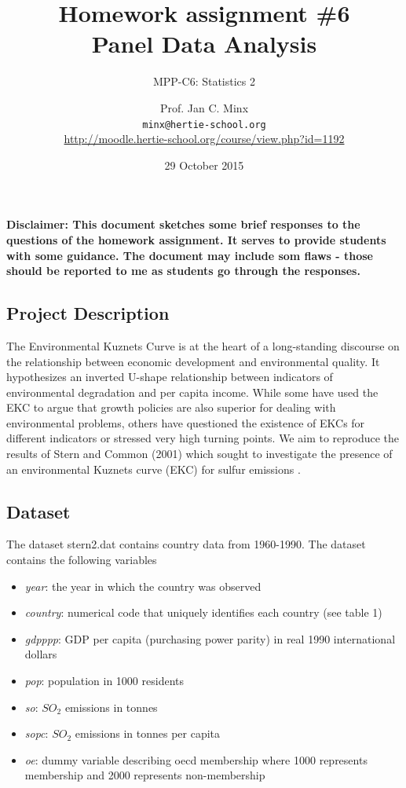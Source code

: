 \documentclass{scrartcl}
\begin{document}
	\title{Homework assignment \#6\\ Panel Data Analysis}
	\subtitle{MPP-C6: Statistics 2}
	\author{Prof. Jan C. Minx\\ \texttt{minx@hertie-school.org} \\
		\url{http://moodle.hertie-school.org/course/view.php?id=1192}}
	\date{29 October 2015}
	
	\maketitle
	
	\indent\textbf{Disclaimer: This document sketches some brief responses to the questions of the homework assignment. It serves to provide students with some guidance. The document may include som flaws - those should be reported to me as students go through the responses.}

	\subsection*{Project Description}
	The Environmental Kuznets Curve is at the heart of a long-standing discourse on the relationship between economic development and environmental quality. It hypothesizes an inverted U-shape relationship between indicators of environmental degradation and per capita income. While some have used the EKC to argue that growth policies are also superior for dealing with environmental problems, others have questioned the existence of EKCs for different indicators or stressed very high turning points. We aim to reproduce the results of Stern and Common (2001) which sought to investigate the presence of an environmental Kuznets curve (EKC) for sulfur emissions \cite{stern2001there}.
	
	\subsection*{Dataset}
	The dataset stern2.dat contains country data from 1960-1990. The dataset contains the following variables
	\begin{itemize}
	\item \textit{year}: the year in which the country was observed 
	\item \textit{country}: numerical code that uniquely identifies each country (see table 1)
	\item \textit{gdpppp}: GDP per capita (purchasing power parity) in real 1990 international dollars
	\item \textit{pop}: population in 1000 residents
	\item \textit{so}: \(SO_2\) emissions in tonnes
	\item \textit{sopc}: \(SO_2\) emissions in tonnes per capita
	\item \textit{oe}: dummy variable describing oecd membership where 1000 represents membership and 2000 represents non-membership
	\end{itemize}
	
\end{document}
